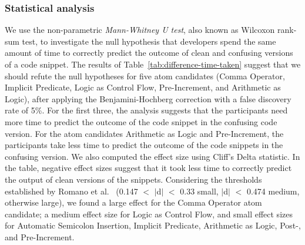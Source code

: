 \subsubsection*{Statistical analysis}
We use the non-parametric \emph{Mann-Whitney U test}, also known as Wilcoxon rank-sum test, to
investigate the null hypothesis that developers 
spend the same amount of time to correctly
predict the outcome of clean and confusing versions of a code snippet.
The results of Table~\ref{tab:difference-time-taken}
suggest that we should refute the null hypotheses for five atom candidates (Comma Operator, Implicit Predicate, Logic as Control Flow, Pre-Increment, and Arithmetic as Logic), after applying the Benjamini-Hochberg correction with a false discovery rate of 5\%. For the first three, the analysis suggests that the participants need more time to predict the outcome of the code snippet in the confusing code version. For the atom candidates Arithmetic as Logic and Pre-Increment, the participants take less time to predict the outcome of the code snippets in the confusing version. We also computed the effect size using Cliff's Delta statistic. In the table, negative effect sizes suggest that it took less time to correctly predict the output of clean versions of the snippets.  Considering the thresholds established by Romano et al.~\cite{Romano:2006:ASO} (0.147 $<$ $|$d$|$ $<$ 0.33 small, $|$d$|$ $<$ 0.474 medium, otherwise large), we found a large effect for the Comma Operator atom candidate; a medium effect size for Logic as Control Flow, and small effect sizes for Automatic Semicolon Insertion, Implicit Predicate, Arithmetic as Logic, Post-, and Pre-Increment. 






